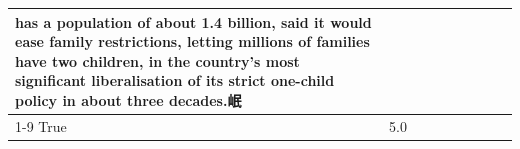 \begin{table}[H]
\begin{tabular}{lllrlllll}
has a population of about 1.4 billion, said it would ease family restrictions, letting millions of families have two children, in the country's most significant liberalisation of its strict one-child policy in about three decades.岷 \\
\cline{1-9}
True & 5.0%
\end{tabular}
\end{table}
